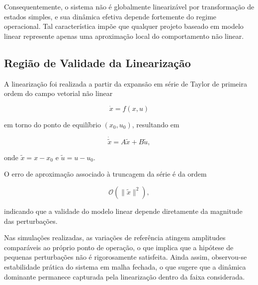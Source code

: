 Consequentemente, o sistema não é globalmente linearizável por transformação de estados simples, e sua dinâmica efetiva depende fortemente do regime operacional. Tal característica impõe que qualquer projeto baseado em modelo linear represente apenas uma aproximação local do comportamento não linear.

\subsection{Região de Validade da Linearização}

A linearização foi realizada a partir da expansão em série de Taylor de primeira ordem do campo vetorial não linear

\begin{equation}
\dot{x} = f(x,u)
\end{equation}

em torno do ponto de equilíbrio $(x_0,u_0)$, resultando em

\begin{equation}
\dot{\tilde{x}} = A \tilde{x} + B \tilde{u},
\end{equation}

onde $\tilde{x} = x - x_0$ e $\tilde{u} = u - u_0$.

O erro de aproximação associado à truncagem da série é da ordem

\begin{equation}
\mathcal{O}(\|\tilde{x}\|^2),
\end{equation}

indicando que a validade do modelo linear depende diretamente da magnitude das perturbações.

Nas simulações realizadas, as variações de referência atingem amplitudes comparáveis ao próprio ponto de operação, o que implica que a hipótese de pequenas perturbações não é rigorosamente satisfeita. Ainda assim, observou-se estabilidade prática do sistema em malha fechada, o que sugere que a dinâmica dominante permanece capturada pela linearização dentro da faixa considerada.


